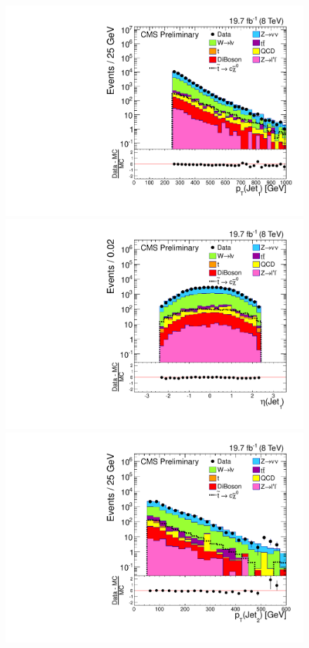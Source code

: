 \begin{figure}%
  \begin{center}
  \includegraphics[scale=0.30]     {Figures/sus13009/cut/Jet1Pt.pdf}
  \includegraphics[scale=0.30]     {Figures/sus13009/cut/Jet1Eta.pdf}
  \includegraphics[scale=0.30]     {Figures/sus13009/cut/Jet2Pt.pdf}

\end{center}
\end{figure}
